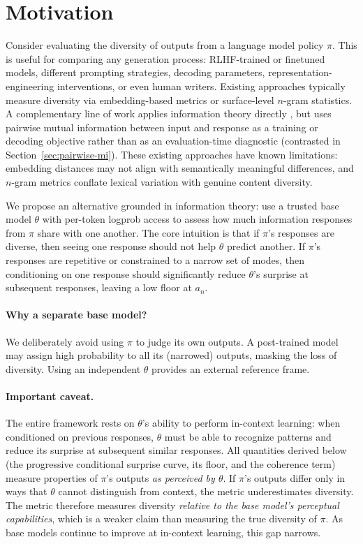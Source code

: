 \section{Motivation}\label{sec:motivation}

Consider evaluating the diversity of outputs from a language model policy $\pi$.
This is useful for comparing any generation process: RLHF-trained or finetuned models, different prompting strategies, decoding parameters, representation-engineering interventions, or even human writers.
Existing approaches typically measure diversity via embedding-based metrics \citep{du2019boosting} or surface-level $n$-gram statistics.
A complementary line of work applies information theory directly \citep{li2016diversity, zhang2018aim}, but uses pairwise mutual information between input and response as a training or decoding objective rather than as an evaluation-time diagnostic (contrasted in Section~\ref{sec:pairwise-mi}).
These existing approaches have known limitations: embedding distances may not align with semantically meaningful differences, and $n$-gram metrics conflate lexical variation with genuine content diversity.

We propose an alternative grounded in information theory: use a trusted base model $\theta$ with per-token logprob access to assess how much information responses from $\pi$ share with one another.
The core intuition is that if $\pi$'s responses are diverse, then seeing one response should not help $\theta$ predict another.
If $\pi$'s responses are repetitive or constrained to a narrow set of modes, then conditioning on one response should significantly reduce $\theta$'s surprise at subsequent responses, leaving a low floor at $a_n$.

\paragraph{Why a separate base model?} We deliberately avoid using $\pi$ to judge its own outputs.
A post-trained model may assign high probability to all its (narrowed) outputs, masking the loss of diversity.
Using an independent $\theta$ provides an external reference frame.

\paragraph{Important caveat.} The entire framework rests on $\theta$'s ability to perform in-context learning: when conditioned on previous responses, $\theta$ must be able to recognize patterns and reduce its surprise at subsequent similar responses.
All quantities derived below (the progressive conditional surprise curve, its floor, and the coherence term) measure properties of $\pi$'s outputs \emph{as perceived by $\theta$}.
If $\pi$'s outputs differ only in ways that $\theta$ cannot distinguish from context, the metric underestimates diversity.
The metric therefore measures diversity \emph{relative to the base model's perceptual capabilities}, which is a weaker claim than measuring the true diversity of $\pi$.
As base models continue to improve at in-context learning, this gap narrows.

